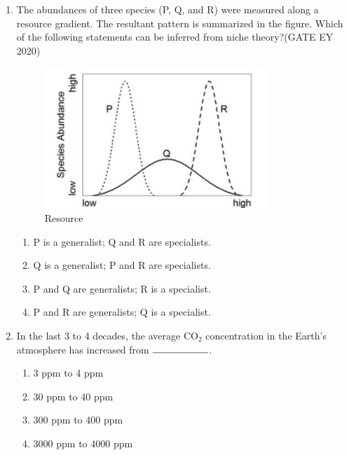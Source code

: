 \begin{enumerate}
\item The abundances of three species (P, Q, and R) were measured along a resource gradient. The resultant pattern is summarized in the figure. Which of the following statements can be inferred from niche theory?\hfill {(GATE EY 2020)}
\begin{center}
\begin{figure}[H]
    \includegraphics[width=0.8\textwidth]{figs/fig3.png}
\caption{Resource}
\label{fig:q14}
\end{figure}
\end{center}

\begin{multicols}{2}
\begin{enumerate}
\item P is a generalist; Q and R are specialists.
\item Q is a generalist; P and R are specialists.
\item P and Q are generalists; R is a specialist.
\item P and R are generalists; Q is a specialist.
\end{enumerate}
\end{multicols}

\item In the last 3 to 4 decades, the average CO$_2$ concentration in the Earth's atmosphere has increased from $\rule{2cm}{0.15mm}$.
\begin{multicols}{2}
\begin{enumerate}
\item 3 ppm to 4 ppm
\item 30 ppm to 40 ppm
\item 300 ppm to 400 ppm
\item 3000 ppm to 4000 ppm
\end{enumerate}
\end{multicols}


\end{enumerate}
